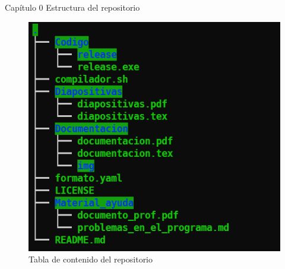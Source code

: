 \documentclass[
  spanish,
  ignorenonframetext,
]{beamer}
\begin{document}
\begin{frame}{Capítulo 0 Estructura del repositorio}
\protect\hypertarget{capuxedtulo-0-estructura-del-repositorio}{}
\begin{figure}
\centering
\includegraphics{img/README/Screenshot_1.png}
\caption{Tabla de contenido del repositorio}
\end{figure}
\end{frame}
\end{document}
